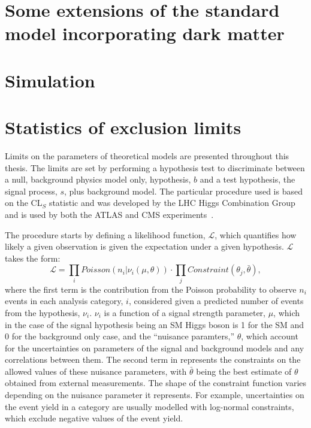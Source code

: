\section{Some extensions of the standard model incorporating dark matter}
\label{sec:DMextensions}

\section{Simulation}
\label{sec:sim}
\label{sec:mcweights}

\section{Statistics of exclusion limits}
\label{sec:stats}
Limits on the parameters of theoretical models are presented throughout this thesis. The limits are set by performing a hypothesis test to discriminate between a null, background physics model only, hypothesis, $b$ and a test hypothesis, the signal process, $s$, plus background model. The particular procedure used is based on the CL$_{S}$ statistic and was developed by the LHC Higgs Combination Group and is used by both the ATLAS and CMS experiments~\cite{ATL-PHYS-PUB-2011-011}. 

The procedure starts by defining a likelihood function, $\mathcal{L}$, which quantifies how likely a given observation is given the expectation under a given hypothesis. $\mathcal{L}$ takes the form:
\begin{equation}
  \label{eq:likelihood}
  \mathcal{L}=\displaystyle\prod_{i}Poisson\left(n_{i}|\nu_{i}\left(\mu,\theta\right)\right)\cdot\prod_{j}Constraint\left(\theta_{j},\bar{\theta}\right),
\end{equation}
where the first term is the contribution from the Poisson probability to observe $n_{i}$ events in each analysis category, $i$, considered given a predicted number of events from the hypothesis, $\nu_{i}$. $\nu_{i}$ is a function of a signal strength parameter, $\mu$, which in the case of the signal hypothesis being an SM Higgs boson is 1 for the SM and 0 for the background only case, and the ``nuisance paramters,'' $\theta$, which account for the uncertainties on parameters of the signal and background models and any correlations between them. The second term in  represents the constraints on the allowed values of these nuisance parameters, with $\bar{\theta}$ being the best estimate of $\theta$ obtained from external measurements. The shape of the constraint function varies depending on the nuisance parameter it represents. For example, uncertainties on the event yield in a category are usually modelled with log-normal constraints, which exclude negative values of the event yield. 

